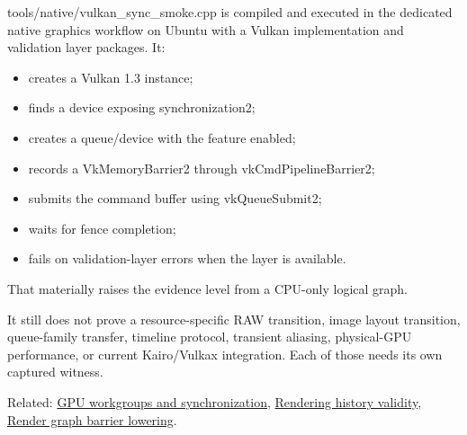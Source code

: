 tools/native/vulkan\_sync\_smoke.cpp is compiled and executed in the dedicated native graphics workflow on Ubuntu with a Vulkan implementation and validation layer packages. It:

\begin{itemize}
\tightlist
\item
  creates a Vulkan 1.3 instance;
\item
  finds a device exposing synchronization2;
\item
  creates a queue/device with the feature enabled;
\item
  records a VkMemoryBarrier2 through vkCmdPipelineBarrier2;
\item
  submits the command buffer using vkQueueSubmit2;
\item
  waits for fence completion;
\item
  fails on validation-layer errors when the layer is available.
\end{itemize}

That materially raises the evidence level from a CPU-only logical graph.

It still does not prove a resource-specific RAW transition, image layout transition, queue-family transfer, timeline protocol, transient aliasing, physical-GPU performance, or current Kairo/Vulkax integration. Each of those needs its own captured witness.

Related: \hyperref[appendix-f662b5b1773b]{GPU workgroups and synchronization}, \hyperref[appendix-2e7e9fd28a2c]{Rendering history validity}, \hyperref[appendix-0fc95374cb7e]{Render graph barrier lowering}.
